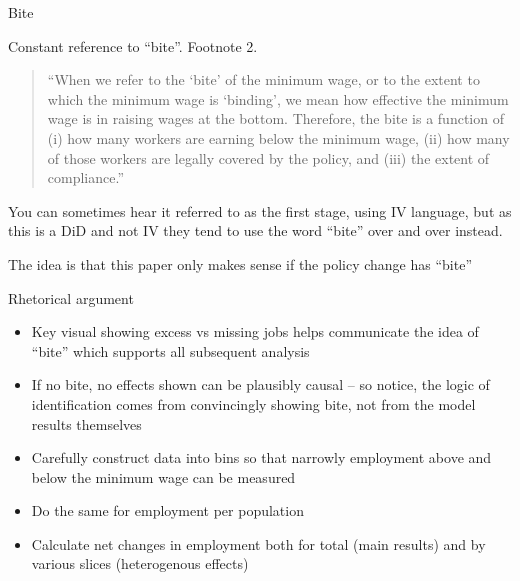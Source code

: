 \documentclass{beamer}
\begin{document}
\begin{frame}{Bite}

Constant reference to ``bite''.  Footnote 2.

\bigskip

\begin{quote}
``When we refer to the `bite' of the minimum wage, or to the extent to which the minimum wage is `binding', we mean how effective the minimum wage is in raising wages at the bottom.  Therefore, the bite is a function of (i) how many workers are earning below the minimum wage, (ii) how many of those workers are legally covered by the policy, and (iii) the extent of compliance.''
\end{quote}

\bigskip

You can sometimes hear it referred to as the first stage, using IV language, but as this is a DiD and not IV they tend to use the word ``bite'' over and over instead.

\bigskip

The idea is that this paper only makes sense if the policy change has ``bite''

\end{frame}


\begin{frame}{Rhetorical argument}

\begin{itemize}
\item Key visual showing excess vs missing jobs helps communicate the idea of ``bite'' which supports all subsequent analysis
\item If no bite, no effects shown can be plausibly causal -- so notice, the logic of identification comes from convincingly showing bite, not from the model results themselves
\item Carefully construct data into bins so that narrowly employment above and below the minimum wage can be measured
\item Do the same for employment per population
\item Calculate net changes in employment both for total (main results) and by various slices (heterogenous effects)
\end{itemize}

\end{frame}
\end{document}
